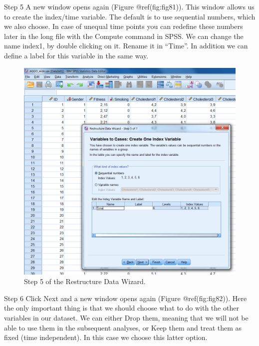 \documentclass[
]{book}
\begin{document}
Step 5 A new window opens again (Figure @ref(fig:fig81)). This window
allows us to create the index/time variable. The default is to use
sequential numbers, which we also choose. In case of unequal time points
you can redefine these numbers later in the long file with the Compute
command in SPSS. We can change the name index1, by double clicking on
it. Rename it in ``Time''. In addition we can define a label for this
variable in the same way.

\begin{figure}

{\centering \includegraphics[width=0.9\linewidth]{images/fig7.11} 

}

\caption{Step 5 of the Restructure Data Wizard.}\label{fig:fig81}
\end{figure}

Step 6 Click Next and a new window opens again (Figure @ref(fig:fig82)).
Here the only important thing is that we should choose what to do with
the other variables in our dataset. We can either Drop them, meaning
that we will not be able to use them in the subsequent analyses, or Keep
them and treat them as fixed (time independent). In this case we choose
this latter option.
\end{document}
